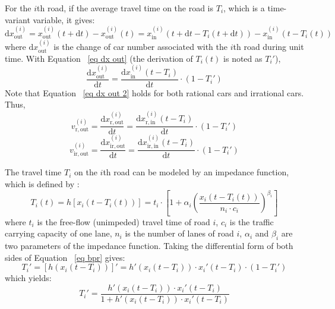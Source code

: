 \documentclass[review,11pt,nonatbib]{elsarticle}
\begin{document}
\par For the $i$th road, if the average travel time on the road is $T_i$, which is a time-variant variable, it gives:
\begin{equation}\label{eq dx out}
\mathrm{d}x_{\mathrm{out}}^{(i)} = x_{\mathrm{out}}^{(i)}(t+\mathrm{d}t)- x_{\mathrm{out}}^{(i)}(t) =
                               x_{\mathrm{in}}^{(i)}(t+\mathrm{d}t-T_i(t+\mathrm{d}t)) - x_{\mathrm{in}}^{(i)}(t - T_i(t))
\end{equation}
where $\mathrm{d}x_{\mathrm{out}}^{(i)}$ is the change of car number associated with the $i$th road during unit time. With Equation ~\eqref{eq dx out} (the derivation of $T_i(t)$ is noted as $T_i'$),
\begin{equation}\label{eq dx out 2}
\frac{\mathrm{d}x_{\mathrm{out}}^{(i)}}{\mathrm{d}t} = \frac{\mathrm{d}x_{\mathrm{in}}^{(i)}(t-T_i)}{\mathrm{d}t}\cdot\left(1-T_i'\right)
\end{equation}
Note that Equation ~\eqref{eq dx out 2} holds for both rational cars and irrational cars. Thus,
\begin{equation}\label{eq vr out}
v_{\mathrm{r,out}}^{(i)} =
\frac{\mathrm{d}x_{\mathrm{r,out}}^{(i)}}{\mathrm{d}t} = \frac{\mathrm{d}x_{\mathrm{r,in}}^{(i)}(t-T_i)}{\mathrm{d}t}\cdot\left(1-T_i'\right)
\end{equation}
\begin{equation}\label{eq vir out}
v_{\mathrm{ir,out}}^{(i)} =
\frac{\mathrm{d}x_{\mathrm{ir,out}}^{(i)}}{\mathrm{d}t} = \frac{\mathrm{d}x_{\mathrm{ir,in}}^{(i)}(t-T_i)}{\mathrm{d}t}\cdot\left(1-T_i'\right)
\end{equation}
\par The travel time $T_i$ on the $i$th road can be modeled by an impedance function, which is defined by \citep{Branston1976Link}:
\begin{equation}\label{eq bpr}
T_i(t)=h[x_i(t-T_i(t))]=t_i\cdot\left[1+\alpha_i\left(\frac{x_i(t-T_i(t))}{n_i\cdot c_i}\right)^{\beta_i}\right]
\end{equation}
where $t_i$ is the free-flow (unimpeded) travel time of road $i$, $c_i$ is the traffic carrying capacity of one lane, $n_i$ is the number of lanes of road $i$, $\alpha_i$ and $\beta_i$ are two parameters of the impedance function. Taking the differential form of both sides of Equation ~\eqref{eq bpr} gives:
\begin{equation}
T_i'=[h(x_i(t-T_i))]' = h'(x_i(t-T_i))\cdot x_i'(t-T_i)\cdot (1-T_i')
\end{equation}
which yields:
\begin{equation}\label{eq Ti diff}
T_i'=\frac{h'(x_i(t-T_i))\cdot x_i'(t-T_i)}{1+h'(x_i(t-T_i))\cdot x_i'(t-T_i)}
\end{equation}
\end{document}
